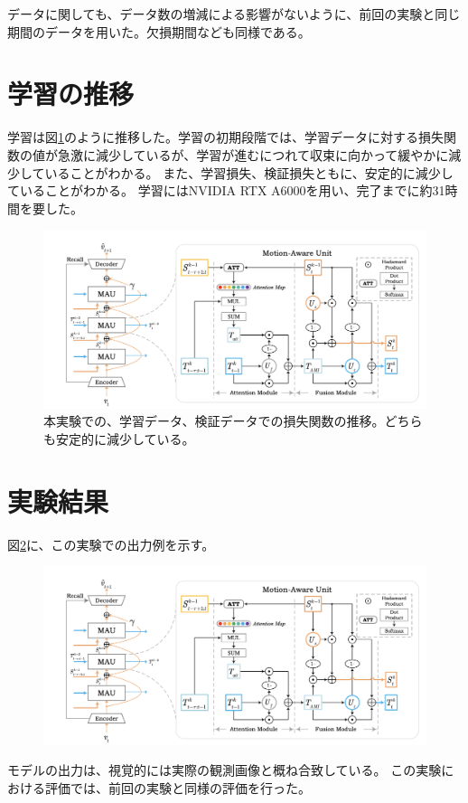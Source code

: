     データに関しても、データ数の増減による影響がないように、前回の実験と同じ期間のデータを用いた。欠損期間なども同様である。

  \section{学習の推移}
  
  学習は図\ref{fig:exp2_learn_progress}のように推移した。学習の初期段階では、学習データに対する損失関数の値が急激に減少しているが、学習が進むにつれて収束に向かって緩やかに減少していることがわかる。
  また、学習損失、検証損失ともに、安定的に減少していることがわかる。
  学習にはNVIDIA RTX A6000を用い、完了までに約31時間を要した。
  \begin{figure}[htpb]
    \centering
    \includegraphics[width=\textwidth]{figures/mau.png}
    \caption{本実験での、学習データ、検証データでの損失関数の推移。どちらも安定的に減少している。}
    \label{fig:exp2_learn_progress}
  \end{figure}

  \section{実験結果}
    図\ref{fig:exp2_out}に、この実験での出力例を示す。
    \begin{figure}[h]
      \centering
      \includegraphics[width=\textwidth]{figures/mau.png}
      \caption{}
      \label{fig:exp2_out}
    \end{figure}
    モデルの出力は、視覚的には実際の観測画像と概ね合致している。
    この実験における評価では、前回の実験と同様の評価を行った。
  
